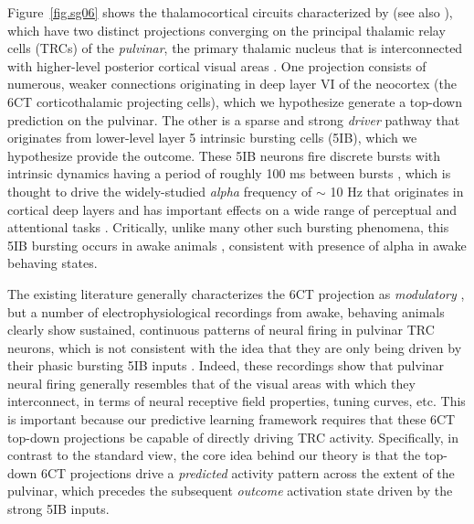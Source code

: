 \documentclass[11pt,twoside]{article}
\newif\myifpdf
\begin{document}
Figure~\ref{fig.sg06} shows the thalamocortical circuits characterized by \citet{ShermanGuillery06} (see also \citealp{ShermanGuillery13,UsreySherman18}), which have two distinct projections converging on the principal thalamic relay cells (TRCs) of the \emph{pulvinar}, the primary thalamic nucleus that is interconnected with higher-level posterior cortical visual areas \citep{Shipp03,ArcaroPinskKastner15,HalassaKastner17}.  One projection consists of numerous, weaker connections originating in deep layer VI of the neocortex (the 6CT corticothalamic projecting cells), which we hypothesize generate a top-down prediction on the pulvinar.  The other is a sparse \citep{Rockland98a,Rockland96} and strong \emph{driver} pathway that originates from lower-level layer 5 intrinsic bursting cells (5IB), which we hypothesize provide the outcome.  These 5IB neurons fire discrete bursts with intrinsic dynamics having a period of roughly 100 ms between bursts \citep{ConnorsGutnickPrince82,SilvaAmitaiConnors91,LarkumZhuSakmann99,FranceschettiGuatteoPanzicaEtAl95,SaalmannPinskWangEtAl12}, which is thought to drive the widely-studied \emph{alpha} frequency of $\sim$ 10 Hz that originates in cortical deep layers and has important effects on a wide range of perceptual and attentional tasks \citep{BuffaloFriesLandmanEtAl11,VanRullenKoch03,MathewsonGrattonFabianiEtAl09,JensenBonnefondVanRullen12,ClaytonYeungKadosh18}.  Critically, unlike many other such bursting phenomena, this 5IB bursting occurs in awake animals \citep{LuczakBarthoHarris09,LuczakBarthoHarris13,SakataHarris09,SakataHarris12}, consistent with presence of alpha in awake behaving states.

The existing literature generally characterizes the 6CT projection as \emph{modulatory} \citep{ShermanGuillery13,UsreySherman18}, but a number of electrophysiological recordings from awake, behaving animals clearly show sustained, continuous patterns of neural firing in pulvinar TRC neurons, which is not consistent with the idea that they are only being driven by their phasic bursting 5IB inputs \citep{Bender82,PetersenRobinsonKeys85,BenderYouakim01,Robinson93,SaalmannPinskWangEtAl12,KomuraNikkuniHirashimaEtAl13,ZhouSchaferDesimone16}.  Indeed, these recordings show that pulvinar neural firing generally resembles that of the visual areas with which they interconnect, in terms of neural receptive field properties, tuning curves, etc.  This is important because our predictive learning framework requires that these 6CT top-down projections be capable of directly driving TRC activity.  Specifically, in contrast to the standard view, the core idea behind our theory is that the top-down 6CT projections drive a \emph{predicted} activity pattern across the extent of the pulvinar, which precedes the subsequent \emph{outcome} activation state driven by the strong 5IB inputs.
\end{document}
